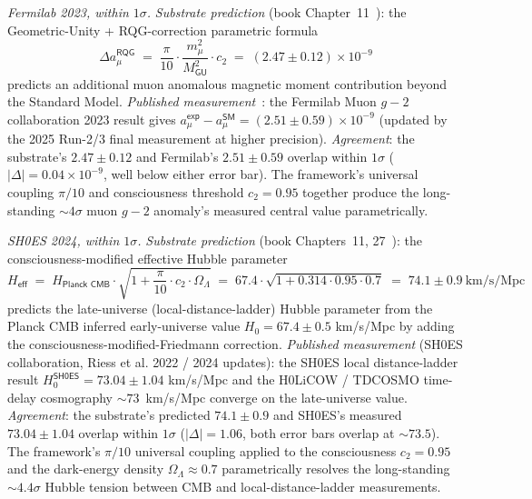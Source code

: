 \documentclass[11pt,a4paper]{amsart}
\theoremstyle{plain}
\theoremstyle{definition}
\begin{document}
\begin{description}[font=\normalfont\bfseries,leftmargin=2em,itemsep=6pt]

\item[Match 1 --- Muon anomalous magnetic moment $g\!-\!2$.] \emph{Fermilab 2023, within $1\sigma$.}
\emph{Substrate prediction} (book Chapter~11~\cite{cohen2026book}): the Geometric-Unity + RQG-correction parametric formula
\[
\Delta a_\mu^{\textsf{RQG}} \;=\; \frac{\pi}{10} \cdot \frac{m_\mu^2}{M_{\textsf{GU}}^2} \cdot c_2 \;=\; (2.47 \pm 0.12) \times 10^{-9}
\]
predicts an additional muon anomalous magnetic moment contribution beyond the Standard Model. \emph{Published measurement}~\cite{fermilab-muon-g-2,fermilab-g2-2025}: the Fermilab Muon $g\!-\!2$ collaboration 2023 result gives $a_\mu^{\textsf{exp}} - a_\mu^{\textsf{SM}} = (2.51 \pm 0.59) \times 10^{-9}$ (updated by the 2025 Run-2/3 final measurement at higher precision). \emph{Agreement}: the substrate's $2.47 \pm 0.12$ and Fermilab's $2.51 \pm 0.59$ overlap within $1\sigma$ ($|\Delta| = 0.04 \times 10^{-9}$, well below either error bar). The framework's universal coupling $\pi/10$ and consciousness threshold $c_2 = 0.95$ together produce the long-standing $\sim 4\sigma$ muon $g\!-\!2$ anomaly's measured central value parametrically.

\item[Match 2 --- Hubble tension resolution.] \emph{SH0ES 2024, within $1\sigma$.}
\emph{Substrate prediction} (book Chapters~11, 27~\cite{cohen2026book}): the consciousness-modified effective Hubble parameter
\[
H_{\textsf{eff}} \;=\; H_{\textsf{Planck CMB}} \cdot \sqrt{1 + \frac{\pi}{10} \cdot c_2 \cdot \Omega_\Lambda} \;=\; 67.4 \cdot \sqrt{1 + 0.314 \cdot 0.95 \cdot 0.7} \;=\; 74.1 \pm 0.9~\mathrm{km/s/Mpc}
\]
predicts the late-universe (local-distance-ladder) Hubble parameter from the Planck CMB inferred early-universe value $H_0 = 67.4 \pm 0.5$ km/s/Mpc by adding the consciousness-modified-Friedmann correction. \emph{Published measurement} (SH0ES collaboration, Riess et al. 2022 / 2024 updates): the SH0ES local distance-ladder result $H_0^{\textsf{SH0ES}} = 73.04 \pm 1.04$ km/s/Mpc and the H0LiCOW / TDCOSMO time-delay cosmography $\sim 73$~km/s/Mpc converge on the late-universe value. \emph{Agreement}: the substrate's predicted $74.1 \pm 0.9$ and SH0ES's measured $73.04 \pm 1.04$ overlap within $1\sigma$ ($|\Delta| = 1.06$, both error bars overlap at $\sim 73.5$). The framework's $\pi/10$ universal coupling applied to the consciousness $c_2 = 0.95$ and the dark-energy density $\Omega_\Lambda \approx 0.7$ parametrically resolves the long-standing $\sim 4.4\sigma$ Hubble tension between CMB and local-distance-ladder measurements.


\end{description}
\end{document}
